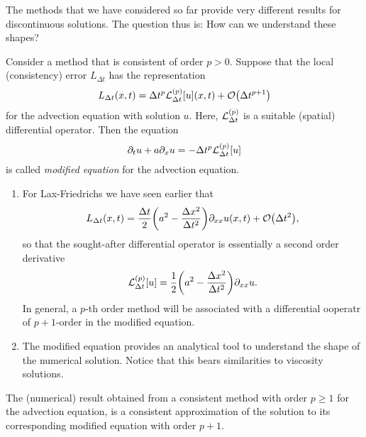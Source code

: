 The methods that we have considered so far provide very different results for discontinuous solutions.
The question thus is:
How can we understand these shapes?

\begin{definition}
	Consider a method that is consistent of order \(p > 0\).
	Suppose that the local (consistency) error \(L_{\Delta t}\) has the representation
	\[
		L_{\Delta t}\parentheses*{x, t} = \Delta t^p \mathcal{L}_{\Delta t}^{\parentheses*{p}}\brackets*{u}\parentheses*{x, t} + \mathcal{O}\parentheses*{\Delta t^{p + 1}}
	\]
	for the advection equation with solution \(u\).
	Here, \(\mathcal{L}_{\Delta t}^{\parentheses*{p}}\) is a suitable (spatial) differential operator.
	Then the equation
	\[
		\partial_t u + a\partial_x u = -\Delta t^p \mathcal{L}_{\Delta t}^{\parentheses*{p}}\brackets*{u}
	\]
	is called \emph{modified equation} for the advection equation.
\end{definition}

\begin{remark}
	\begin{enumerate}
		\item For Lax-Friedrichs we have seen earlier that
		\[
			L_{\Delta t}\parentheses*{x, t} = \frac{\Delta t}{2}\parentheses*{a^2 - \frac{\Delta x^2}{\Delta t^2}}\partial_{xx}u\parentheses*{x, t} + \mathcal{O}\parentheses*{\Delta t^2},
		\]
		so that the sought-after differential operator is essentially a second order derivative
		\[
			\mathcal{L}_{\Delta t}^{\parentheses*{p}}\brackets*{u} = \frac{1}{2}\parentheses*{a^2 - \frac{\Delta x^2}{\Delta t^2}}\partial_{xx}u.
		\]
		In general, a \(p\)-th order method will be associated with a differential ooperatr of \(p + 1\)-order in the modified equation.
		\item The modified equation provides an analytical tool to understand the shape of the numerical solution.
		Notice that this bears similarities to viscosity solutions.
	\end{enumerate}
\end{remark}

\begin{theorem}
	The (numerical) result obtained from a consistent method with order \(p \ge 1\) for the advection equation, is a consistent approximation of the solution to its corresponding modified equation with order \(p + 1\).
\end{theorem}

